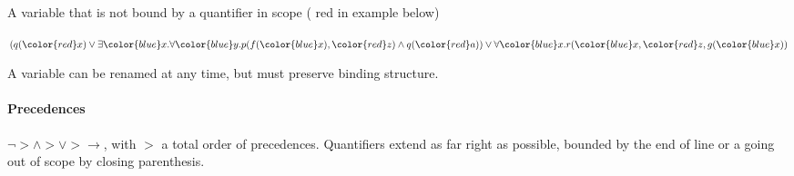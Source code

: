  A variable that is not bound by a quantifier in scope ({\color{red} red in example below})

\inlineexample $(q({\color{red} x}) \lor \exists {\color{blue} x}.\forall {\color{blue} y}. p(f({\color{blue} x}), {\color{red} z}) \land q({\color{red} a}))
\lor \forall {\color{blue} x}.r({\color{blue} x}, {\color{red} z}, g({\color{blue} x}))$

 A  variable can be renamed at any time, but must preserve binding structure.


\paragraph{Precedences} 
$\neg > \land > \lor > \rightarrow$, with $>$ a total order of precedences.
Quantifiers extend as far right as possible, bounded by the end of line or a going out of scope by closing parenthesis.
